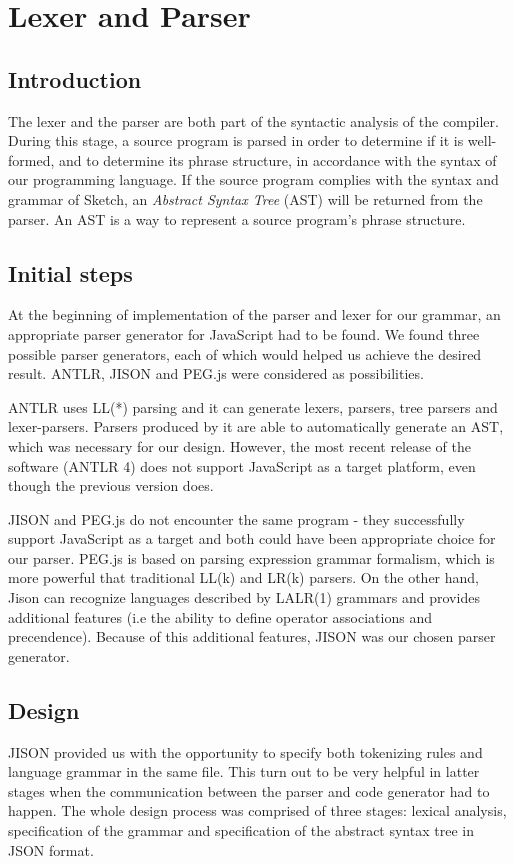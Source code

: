 \documentclass{l3proj}
\begin{document}
\section{Lexer and Parser}
\label{arch-lex}
\subsection{Introduction}
The lexer and the parser are both part of the syntactic analysis of the compiler. During this stage, a source program is parsed in order to determine if it is well-formed, and to determine its phrase structure, in accordance with the syntax of our programming language. If the source program complies with the syntax and grammar of Sketch, an \textit{Abstract Syntax Tree} (AST) will be returned from the parser. An AST is a way to represent a source program’s phrase structure. 

\subsection{Initial steps}
At the beginning of implementation of the parser and lexer for our grammar, an appropriate parser generator for JavaScript had to be found. We found three possible parser generators, each of which would helped us achieve the desired result. ANTLR, JISON and PEG.js were considered as possibilities.

ANTLR uses LL(*) parsing and it can generate lexers, parsers, tree parsers and lexer-parsers. Parsers produced by it are able to automatically generate an AST, which was necessary for our design. However, the most recent release of the software (ANTLR 4) does not support JavaScript as a target platform, even though the previous version does. 

JISON and PEG.js do not encounter the same program - they successfully support JavaScript as a target and both could have been appropriate choice for our parser. PEG.js is based on parsing expression grammar formalism, which is more powerful that traditional LL(k) and LR(k) parsers. On the other hand, Jison can recognize languages described by LALR(1) grammars and provides additional features (i.e the ability to define operator associations and precendence). Because of this additional features, JISON was our chosen parser generator. 


\setcounter{secnumdepth}{3}
\subsection{Design}
JISON provided us with the opportunity to specify both tokenizing rules and language grammar in the same file. This turn out to be very helpful in latter stages when the communication between the parser and code generator had to happen. The whole design process was comprised of three stages: lexical analysis, specification of the grammar and specification of the abstract syntax tree in JSON format. 
\end{document}
